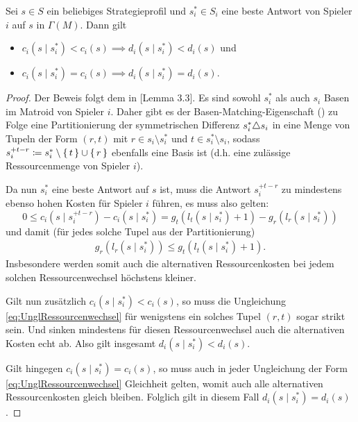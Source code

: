 \begin{prop}\label{prop:BAPotentialFuerMatroidspieleHilfsP}
	Sei $s \in S$ ein beliebiges Strategieprofil und $s^\ast_i \in S_i$ eine beste Antwort von Spieler $i$ auf $s$ in $\Gamma(M)$. Dann gilt
	\begin{itemize}
		\item $c_i(s \mid s^\ast_i) < c_i(s) \implies d_i(s \mid s^\ast_i) < d_i(s)$ und
		\item $c_i(s \mid s^\ast_i) = c_i(s) \implies d_i(s \mid s^\ast_i) = d_i(s)$.
	\end{itemize}
\end{prop}

\begin{proof}
	Der Beweis folgt dem in \cite{OptiIVSkript}[Lemma 3.3].	Es sind sowohl $s^\ast_i$ als auch $s_i$ Basen im Matroid von Spieler $i$. Daher gibt es der Basen-Matching-Eigenschaft () zu Folge eine Partitionierung der symmetrischen Differenz $s^\ast_i \triangle s_i$ in eine Menge von Tupeln der Form $(r,t)$ mit $r \in s_i\setminus s^\ast_i$ und $t \in s^\ast_i \setminus s_i$, sodass $s_i^{+t-r} \coloneqq s^\ast_i\setminus\set{t}\cup\set{r}$ ebenfalls eine Basis ist (d.h. eine zulässige Ressourcenmenge von Spieler $i$).
	
	Da nun $s^\ast_i$ eine beste Antwort auf $s$ ist, muss die Antwort $s_i^{+t-r}$ zu mindestens ebenso hohen Kosten für Spieler $i$ führen, es muss also gelten:
		\[0 \leq c_i(s \mid s_i^{+t-r}) - c_i(s \mid s^\ast_i) = g_t(l_t(s \mid s^\ast_i)+1) - g_r(l_r(s \mid s^\ast_i))\]
	und damit (für jedes solche Tupel aus der Partitionierung)
	\begin{align}\label{eq:UnglRessourcenwechsel}
		g_r(l_r(s \mid s^\ast_i)) \leq g_t(l_t(s \mid s^\ast_i)+1).
	\end{align}
	Insbesondere werden somit auch die alternativen Ressourcenkosten bei jedem solchen Ressourcenwechsel höchstens kleiner.
	
	Gilt nun zusätzlich $c_i(s \mid s^\ast_i) < c_i(s)$, so muss die Ungleichung \eqref{eq:UnglRessourcenwechsel} für wenigstens ein solches Tupel $(r,t)$ sogar strikt sein. Und sinken mindestens für diesen Ressourcenwechsel auch die alternativen Kosten echt ab. Also gilt insgesamt $d_i(s \mid s^\ast_i) < d_i(s)$.
	
	Gilt hingegen $c_i(s \mid s^\ast_i) = c_i(s)$, so muss auch in jeder Ungleichung der Form \eqref{eq:UnglRessourcenwechsel} Gleichheit gelten, womit auch alle alternativen Ressourcenkosten gleich bleiben. Folglich gilt in diesem Fall $d_i(s \mid s^\ast_i) = d_i(s)$.
\end{proof}

